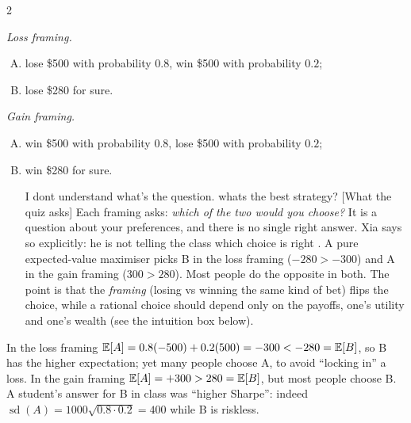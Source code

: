 \begin{paracol}{2}
\begin{example}\label{ex:quiz}
\emph{Loss framing.}
\begin{enumerate}[(A)]
  \item lose \$500 with probability $0.8$, win \$500 with probability $0.2$;
  \item lose \$280 for sure.
\end{enumerate}
\emph{Gain framing.}
\begin{enumerate}[(A)]
  \item win \$500 with probability $0.8$, lose \$500 with probability $0.2$;
  \item win \$280 for sure.
      \begin{answer}{I dont understand what's the question. whats the best strategy? }[What the quiz asks]
Each framing asks: \emph{which of the two would you choose?} It is a question about your
preferences, and there is no single right answer. Xia says so explicitly: he is not telling the class which
choice is right .
A pure expected-value maximiser picks B in the loss framing
($-280>-300$) and A in the gain framing ($300>280$). Most people do the opposite in both. The
point is that the \emph{framing} (losing vs winning the same kind of bet) flips the choice, while a
rational choice should depend only on the payoffs, one's utility and one's wealth (see the
intuition box below).
\end{answer}
\end{enumerate}

\smallskip
In the loss framing $\mathbb{E}[A] = 0.8(-500)+0.2(500) = -300 < -280 = \mathbb{E}[B]$, so B has the higher
expectation; yet many people choose A, to avoid ``locking in'' a loss. In the gain framing
$\mathbb{E}[A] = +300 > 280 = \mathbb{E}[B]$, but most people choose B. A student's answer for B in class was
``higher Sharpe'': indeed $\operatorname{sd}(A) = 1000\sqrt{0.8\cdot 0.2} = 400$ while B is riskless.
\end{example}


\end{paracol}
